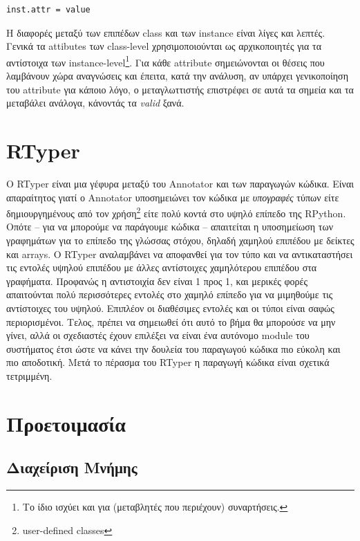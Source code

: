 \begin{verbatim}
inst.attr = value
\end{verbatim}

Η διαφορές μεταξύ των επιπέδων class και των instance είναι λίγες και λεπτές.
Γενικά τα attibutes των class-level χρησιμοποιούνται ως αρχικοποιητές για τα
αντίστοιχα των instance-level\footnote{Το ίδιο ισχύει και για (μεταβλητές που
περιέχουν) συναρτήσεις.}. Για κάθε attribute σημειώνονται οι θέσεις που
λαμβάνουν χώρα αναγνώσεις και έπειτα, κατά την ανάλυση, αν υπάρχει γενικοποίηση
του attribute για κάποιο λόγο, ο μεταγλωττιστής επιστρέφει σε αυτά τα σημεία και
τα μεταβάλει ανάλογα, κάνοντάς τα \textit{valid} ξανά.

\section{RTyper}

Ο RTyper είναι μια γέφυρα μεταξύ του Annotator και των παραγωγών κώδικα. Είναι
απαραίτητος γιατί ο Annotator υποσημειώνει τον κώδικα με \textit{υπογραφές}
τύπων είτε δημιουργημένους από τον χρήση\footnote{user-defined classes} είτε
πολύ κοντά στο υψηλό επίπεδο της RPython. Οπότε – για να μπορούμε να παράγουμε
κώδικα – απαιτείται η υποσημείωση των γραφημάτων για το επίπεδο της γλώσσας
στόχου, δηλαδή χαμηλού επιπέδου με δείκτες και arrays. Ο RTyper αναλαμβάνει να
αποφανθεί για τον τύπο και να αντικαταστήσει τις εντολές υψηλού επιπέδου με
άλλες αντίστοιχες χαμηλότερου επιπέδου στα γραφήματα. Προφανώς η αντιστοιχία
δεν είναι 1 προς 1, και μερικές φορές απαιτούνται πολύ περισσότερες εντολές στο
χαμηλό επίπεδο για να μιμηθούμε τις αντίστοιχες του υψηλού. Επιπλέον οι
διαθέσιμες εντολές και οι τύποι είναι σαφώς περιορισμένοι. Τελος, πρέπει να
σημειωθεί ότι αυτό το βήμα θα μπορούσε να μην γίνει, αλλά οι σχεδιαστές έχουν
επιλέξει να είναι ένα αυτόνομο module του συστήματος έτσι ώστε να κάνει την
δουλεία του παραγωγού κώδικα πιο εύκολη και πιο αποδοτική. Μετά το πέρασμα του
RTyper η παραγωγή κώδικα είναι σχετικά τετριμμένη.


\section{Προετοιμασία}

\subsection{Διαχείριση Μνήμης}

